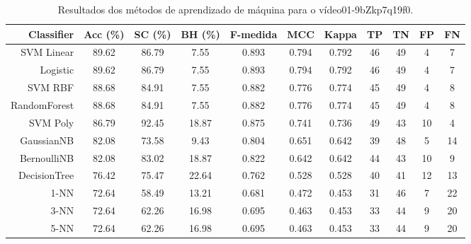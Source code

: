 \begin{table}[!htb]
\centering
\caption{Resultados dos métodos de aprendizado de máquina para o vídeo01-9bZkp7q19f0.}
\label{tab:01-9bZkp7q19f0}
\begin{tabular}{r|c|c|c|c|c|c|c|c|c|c}
\hline\hline
Classifier & Acc (\%) & SC (\%) & BH (\%) & F-medida & MCC & Kappa & TP & TN & FP & FN \\ \hline
SVM Linear & 89.62 & 86.79 & 7.55 & 0.893 & 0.794 & 0.792 & 46 & 49 & 4 & 7 \\ 
Logistic & 89.62 & 86.79 & 7.55 & 0.893 & 0.794 & 0.792 & 46 & 49 & 4 & 7 \\ 
SVM RBF & 88.68 & 84.91 & 7.55 & 0.882 & 0.776 & 0.774 & 45 & 49 & 4 & 8 \\ 
RandomForest & 88.68 & 84.91 & 7.55 & 0.882 & 0.776 & 0.774 & 45 & 49 & 4 & 8 \\ 
SVM Poly & 86.79 & 92.45 & 18.87 & 0.875 & 0.741 & 0.736 & 49 & 43 & 10 & 4 \\ 
GaussianNB & 82.08 & 73.58 & 9.43 & 0.804 & 0.651 & 0.642 & 39 & 48 & 5 & 14 \\ 
BernoulliNB & 82.08 & 83.02 & 18.87 & 0.822 & 0.642 & 0.642 & 44 & 43 & 10 & 9 \\ 
DecisionTree & 76.42 & 75.47 & 22.64 & 0.762 & 0.528 & 0.528 & 40 & 41 & 12 & 13 \\ 
1-NN & 72.64 & 58.49 & 13.21 & 0.681 & 0.472 & 0.453 & 31 & 46 & 7 & 22 \\ 
3-NN & 72.64 & 62.26 & 16.98 & 0.695 & 0.463 & 0.453 & 33 & 44 & 9 & 20 \\ 
5-NN & 72.64 & 62.26 & 16.98 & 0.695 & 0.463 & 0.453 & 33 & 44 & 9 & 20 \\ 
\hline\hline
\end{tabular}
\end{table}
